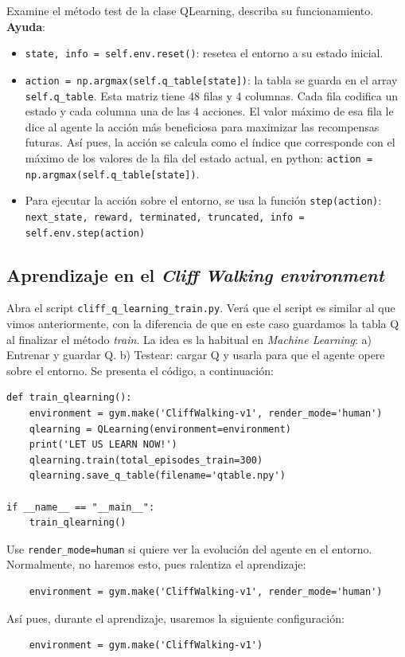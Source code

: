 \documentclass{article}
\begin{document}
\begin{exercise}
Examine el método test de la clase QLearning, describa su funcionamiento. \textbf{Ayuda}:
\begin{itemize}
    \item \texttt{state, info = self.env.reset()}: resetea el entorno a su estado inicial.
    \item \texttt{action = np.argmax(self.q\_table[state])}: la tabla se guarda en el array \texttt{self.q\_table}. Esta matriz tiene 48 filas y 4 columnas. Cada fila codifica un estado y cada columna una de las 4 acciones. El valor máximo de esa fila le dice al agente la acción más beneficiosa para maximizar las recompensas futuras. Así pues, la acción se calcula como el índice que corresponde con el máximo de los valores de la fila del estado actual, en python: \texttt{action = np.argmax(self.q\_table[state])}.
    \item Para ejecutar la acción sobre el entorno, se usa la función \texttt{step(action)}: \texttt{next\_state, reward, terminated, truncated, info = self.env.step(action)}
\end{itemize}
\end{exercise}


\subsection{Aprendizaje en el \textit{Cliff Walking environment}}
Abra el script \texttt{cliff\_q\_learning\_train.py}. Verá que el script es similar al que vimos anteriormente, con la diferencia de que en este caso guardamos la tabla Q al finalizar el método \emph{train}. La idea es la habitual en \textit{Machine Learning}: a) Entrenar y guardar Q. b) Testear: cargar Q y usarla para que el agente opere sobre el entorno. Se presenta el código, a continuación:
\begin{verbatim}
def train_qlearning():    
    environment = gym.make('CliffWalking-v1', render_mode='human')
    qlearning = QLearning(environment=environment)
    print('LET US LEARN NOW!')
    qlearning.train(total_episodes_train=300)    
    qlearning.save_q_table(filename='qtable.npy')

if __name__ == "__main__":
    train_qlearning()    
\end{verbatim}

Use \texttt{render\_mode=human} si quiere ver la evolución del agente en el entorno. Normalmente, no haremos esto, pues ralentiza el aprendizaje:
\begin{verbatim}
    environment = gym.make('CliffWalking-v1', render_mode='human')
\end{verbatim}
Así pues, durante el aprendizaje, usaremos la siguiente configuración:
\begin{verbatim}    
    environment = gym.make('CliffWalking-v1')
\end{verbatim}
    
\end{document}
